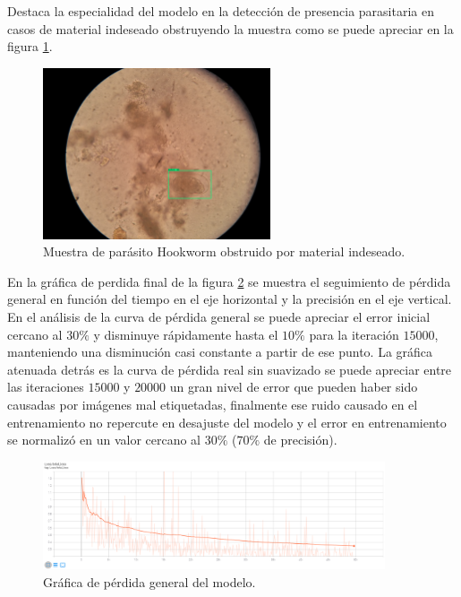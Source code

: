 \documentclass[letter,12pt]{report}
\begin{document}
Destaca la especialidad del modelo en la detección de presencia parasitaria en casos de
material indeseado obstruyendo la muestra como se puede apreciar en la figura
\ref{fig:obstruction}.

\begin{figure}[ht]
    \centering
    \includegraphics[width=0.6\textwidth]{obstruction}
    \caption{Muestra de parásito Hookworm obstruido por material indeseado.}
    \label{fig:obstruction}
\end{figure}

En la gráfica de perdida final de la figura \ref{fig:total_loss} se muestra el seguimiento de
pérdida general en función del tiempo en el eje horizontal y la precisión en el eje vertical.
En el análisis de la curva de pérdida general se puede apreciar el error inicial cercano al
$30\%$ y disminuye rápidamente hasta el $10\%$ para la iteración $15000$, manteniendo una
disminución casi constante a partir de ese punto. La gráfica atenuada detrás es la curva de
pérdida real sin suavizado se puede apreciar entre las iteraciones $15000$ y $20000$ un gran
nivel de error que pueden haber sido causadas por imágenes mal etiquetadas, finalmente ese
ruido causado en el entrenamiento no repercute en desajuste del modelo y el error en 
entrenamiento se normalizó en un valor cercano al $30\%$ ($70\%$ de precisión).

\begin{figure}[ht]
    \centering
    \includegraphics[width=0.9\textwidth]{total_loss}
    \caption{Gráfica de pérdida general del modelo.}
    \label{fig:total_loss}
\end{figure}
\end{document}
